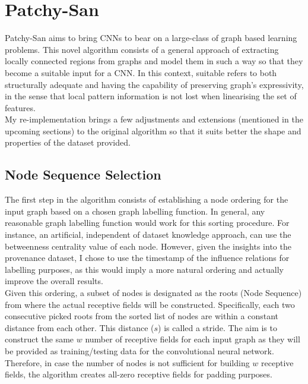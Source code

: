 \section{Patchy-San}

Patchy-San aims to bring CNNs to bear on a large-class of graph based learning problems. This novel algorithm consists of a general approach of extracting locally connected regions from graphs and model them in such a way so that they become a suitable input for a CNN. In this context, suitable refers to both structurally adequate and having the capability of preserving graph's expressivity, in the sense that local pattern information is not lost when linearising the set of features. \\

My re-implementation brings a few adjustments and extensions (mentioned in the upcoming sections) to the original algorithm so that it suits better the shape and properties of the dataset provided. \\

\subsection{Node Sequence Selection}

The first step in the algorithm consists of establishing a node ordering for the input graph based on a chosen graph labelling function. In general, any reasonable graph labelling function would work for this sorting procedure. For instance, an artificial, independent of dataset knowledge approach, can use the betweenness centrality value of each node. However, given the insights into the provenance dataset, I chose to use the timestamp of the influence relations for labelling purposes, as this would imply a more natural ordering and actually improve the overall results. \\

Given this ordering, a subset of nodes is designated as the roots (Node Sequence) from where the actual receptive fields will be constructed. Specifically, each two consecutive picked roots from the sorted list of nodes are within a constant distance from each other. This distance ($s$) is called a stride. The aim is to construct the same $w$ number of receptive fields for each input graph as they will be provided as training/testing data for the convolutional neural network. Therefore, in case the number of nodes is not sufficient for building $w$ receptive fields, the algorithm creates all-zero receptive fields for padding purposes. \\

